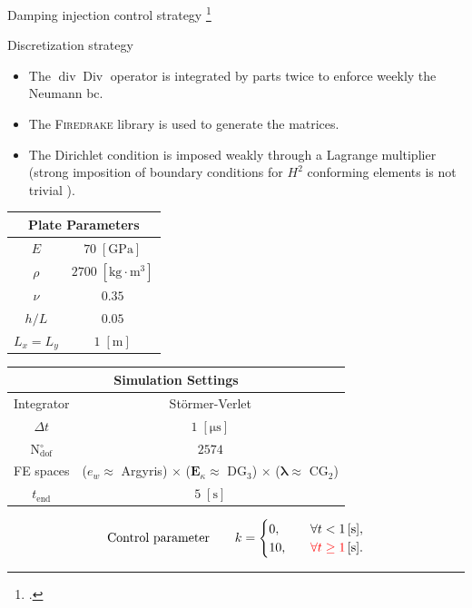 \documentclass[aspectratio=169]{ISAE-Beamer}
\DeclareMathOperator*{\Div}{Div}
\renewcommand{\div}{\operatorname{div}}
\newcommand{\firedrake}{\textsc{Firedrake}\xspace}
\begin{document}
\begin{frame}{Damping injection control strategy}
\footcitetext{lagnese1989}
\end{frame}


\begin{frame}{Discretization strategy}
	\begin{itemize}
		\item The $\div\Div$ operator is integrated by parts twice to enforce weekly the Neumann bc.
		\item The \firedrake library is used to generate the matrices.
		\item The Dirichlet condition is imposed weakly through a Lagrange multiplier (strong imposition of boundary conditions for $H^2$ conforming elements is not trivial ).
	\end{itemize} 
	
	\begin{table}[t]
		\centering
		\begin{tabular}{|c|c|}
			\hline 
			\multicolumn{2}{|c|}{Plate Parameters} \\ 
			\hline 
			$E$ & $70\; \mathrm{[GPa]}$ \\ 
			$\rho$ & $2700\; \mathrm{[kg \cdot m^3]}$ \\ 
			$\nu$& $0.35$ \\ 
			$h/L$& $0.05$ \\ 
			$L_x = L_y$& $1\; \mathrm{[m]}$\\ 
			\hline 
		\end{tabular} \hspace{.1cm}
		\begin{tabular}{|c|c|}
			\hline 
			\multicolumn{2}{|c|}{Simulation Settings} \\
			\hline 
			Integrator & St\"ormer-Verlet \\
			$\Delta t $ & $1 \; \mathrm{[\mu s]}$ \\  
			N$_{\text{dof}}^\circ$ & $2574$ \\
			FE spaces & ($e_w \approx $ Argyris) $\times$ ($\bm{E}_\kappa \approx$ DG$_3$) $\times$ ($\bm{\lambda} \approx$ CG$_2$)\\
			$t_{\text{end}}$ & $5\; \mathrm{[s]}$\\ 
			\hline 
		\end{tabular} 
	\end{table}
	
	\begin{equation*}
		\text{Control parameter} \qquad 
		k = 
		\begin{cases}
			0, \quad &\forall t < 1 \, [\mathrm{s}], \\
			10, \quad & \textcolor{red}{\forall t \ge 1} \, [\mathrm{s}].
		\end{cases}
	\end{equation*}
	
	
\end{frame}
\end{document}
